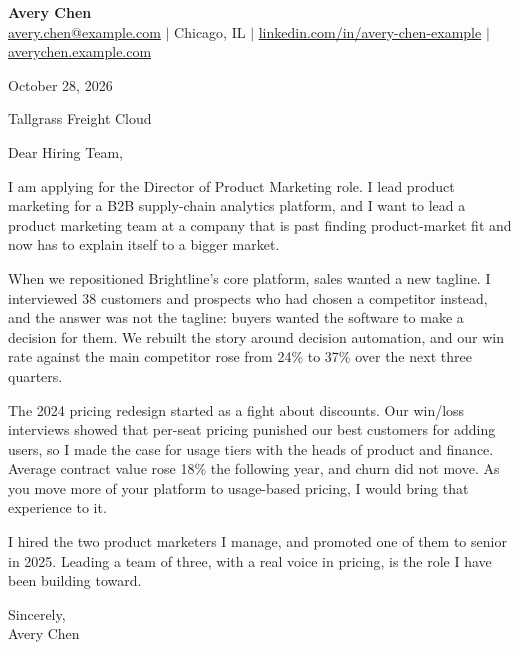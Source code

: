 \documentclass[11pt, letterpaper]{article}
\begin{document}
\pagestyle{empty}

\begin{center}
  \textbf{\LARGE Avery Chen} \\[2pt]
  \href{mailto:avery.chen@example.com}{avery.chen@example.com} $|$ Chicago, IL $|$ \href{https://linkedin.com/in/avery-chen-example}{linkedin.com/in/avery-chen-example} $|$ \href{https://averychen.example.com}{averychen.example.com}
\end{center}
\vspace{10pt}

October 28, 2026

Tallgrass Freight Cloud

Dear Hiring Team,

I am applying for the Director of Product Marketing role. I lead product marketing for a B2B supply-chain analytics platform, and I want to lead a product marketing team at a company that is past finding product-market fit and now has to explain itself to a bigger market.

When we repositioned Brightline's core platform, sales wanted a new tagline. I interviewed 38 customers and prospects who had chosen a competitor instead, and the answer was not the tagline: buyers wanted the software to make a decision for them. We rebuilt the story around decision automation, and our win rate against the main competitor rose from 24\% to 37\% over the next three quarters.

The 2024 pricing redesign started as a fight about discounts. Our win/loss interviews showed that per-seat pricing punished our best customers for adding users, so I made the case for usage tiers with the heads of product and finance. Average contract value rose 18\% the following year, and churn did not move. As you move more of your platform to usage-based pricing, I would bring that experience to it.

I hired the two product marketers I manage, and promoted one of them to senior in 2025. Leading a team of three, with a real voice in pricing, is the role I have been building toward.

Sincerely, \\[18pt]
Avery Chen
\end{document}
